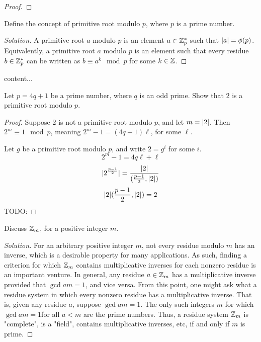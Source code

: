 \documentclass[11pt]{article}
\begin{document}
\begin{proof}

\end{proof}

\begin{exercise}{8}
Define the concept of primitive root modulo $ p $, where $ p $ is a prime number.
\end{exercise}

\begin{proof}[Solution]
A primitive root $ a $ modulo $ p $ is an element $ a \in \mathbb{Z}_{p}^{*} $ such that $ |a| = \phi(p) $. Equivalently, a primitive root $ a $ modulo $ p $ is an element such that every residue $ b \in \mathbb{Z}_{p}^{*} $ can be written as $ b \equiv a^{k} \mod p$ for some $ k \in \mathbb{Z} $.
\end{proof}

\begin{exercise}{9}
content...
\end{exercise}

\begin{exercise}{9}
Let $ p = 4q + 1$ be a prime number, where $ q $ is an odd prime. Show that $ 2 $ is a primitive root modulo $ p $.
\end{exercise}

\begin{proof}
Suppose $ 2 $ is not a primitive root modulo $ p $, and let $ m = |2| $. Then $ 2^{m} \equiv 1 \mod p $, meaning $ 2^{m} - 1 = (4q + 1) \ell $, for some $ \ell $. 

Let $ g $ be a primitive root modulo $ p $, and write $ 2 = g^{i} $ for some $ i $.
\[ 2^{m} - 1 = 4q \ell + \ell \]
\[ |2^{\frac{p-1}{2}}| = \frac{|2|}{(\frac{p-1}{2}, |2|)} \]
\[ |2| (\frac{p-1}{2}, |2|) = 2\]
TODO:
\end{proof}

\begin{exercise}{10}
Discuss $ \mathbb{Z}_{m} $, for a positive integer $ m $.
\end{exercise}

\begin{proof}[Solution]
For an arbitrary positive integer $ m $, not every residue modulo $ m $ has an inverse, which is a desirable property for many applications. As such, finding a criterion for which $ \mathbb{Z}_{m} $ contains multiplicative inverses for each nonzero residue is an important venture. In general, any residue $ a \in \mathbb{Z}_{m} $ has a multiplicative inverse provided that $ \gcd{a}{m} = 1 $, and vice versa. From this point, one might ask what a residue system in which every nonzero residue has a multiplicative inverse. That is, given any residue $ a $, suppose $ \gcd{a}{m} = 1 $. The only such integers $ m $ for which $ \gcd{a}{m}  = 1 $for all $ a < m $ are the prime numbers. Thus, a residue system $ \mathbb{Z}_{m} $ is "complete", is a "field", contains multiplicative inverses, etc, if and only if $ m $ is prime.
\end{proof}
\end{document}
